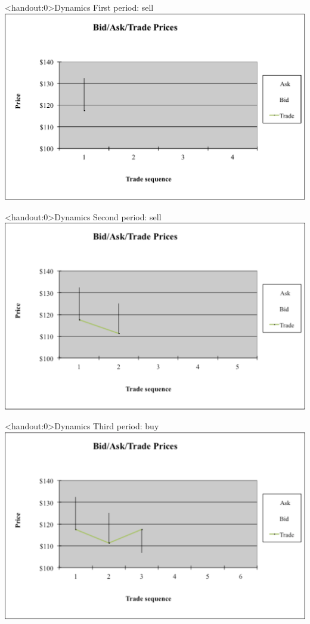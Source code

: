 \documentclass[english,10pt]{beamer}
\begin{document}
\begin{frame}<handout:0>{Dynamics}
	First period: sell
	\center
	\includegraphics[width=0.9\linewidth]{pics/P1_Image.pdf}
\end{frame}


\begin{frame}<handout:0>{Dynamics}
	Second period: sell
	\center
	\includegraphics[width=0.9\linewidth]{pics/P2_Image.pdf}
\end{frame}


\begin{frame}<handout:0>{Dynamics}
	Third period: buy
	\center
	\includegraphics[width=0.9\linewidth]{pics/P3_Image.pdf}
\end{frame}
\end{document}
